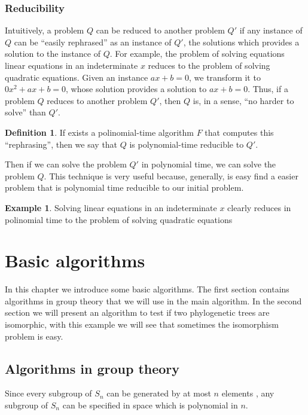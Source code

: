 \documentclass[12pt,a4paper]{book}
\theoremstyle{plain}
\theoremstyle{definition}
\newtheorem{definition}{Definition}
\newtheorem{example}{Example}
\theoremstyle{remark}
\begin{document}
\subsection{Reducibility}
Intuitively, a problem $Q$ can be reduced to another problem $Q'$ if any instance of $Q$ can be ``easily rephrased'' as an instance of $Q'$, 
the solutions which provides a solution to the instance of $Q$. For example, the problem of solving equations linear equations in an 
indeterminate $x$ reduces to the problem of solving quadratic equations. Given an instance $ax+b=0$, we transform it to $0x^2 + ax+b=0$, 
whose solution provides a solution to $ax+b=0$.  Thus, if a problem $Q$ reduces to another problem $Q'$, then $Q$ is, in a sense, 
``no harder to solve'' than $Q'$.

\begin{definition}
If exists a polinomial-time algorithm $F$ that computes this ``rephrasing'', then we say that $Q$ is polynomial-time 
reducible to $Q'$.
\end{definition}

Then if we can solve the problem $Q'$ in polynomial time, we can solve the problem $Q$. This technique is very useful because, generally, is easy 
find a easier problem that is polynomial time reducible to our initial problem. 


\begin{example}
Solving linear equations in an indeterminate $x$ clearly reduces in polinomial time to the problem of solving quadratic equations
\end{example}

\chapter{ Basic algorithms }

In this chapter we introduce some basic algorithms. The first section contains algorithms in group theory that we will use in the 
main algorithm. In the second section we will present an algorithm to test if two phylogenetic trees are isomorphic, with this example 
we will see that sometimes the isomorphism problem is easy.

\section{Algorithms in group theory}

Since every subgroup of $S_n$ can be generated by at most $n$ elements \cite{Mark198660}, any subgroup of $S_n$ can be specified in space 
which is polynomial in $n$.
\end{document}
